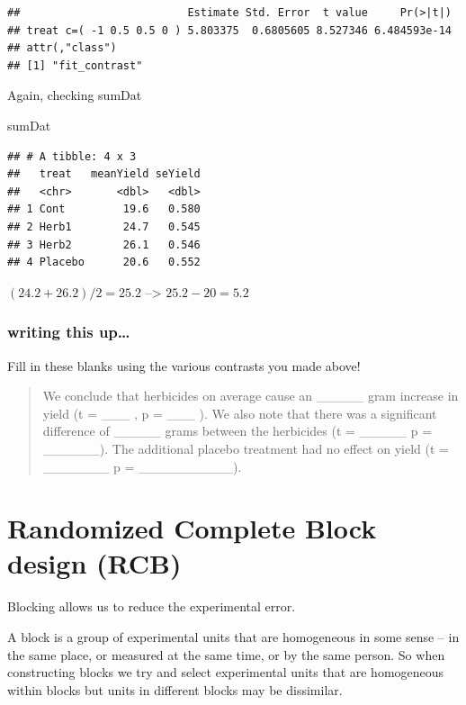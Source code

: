 \documentclass[
]{book}
\newenvironment{Shaded}{\begin{snugshade}}{\end{snugshade}}
\newcommand{\NormalTok}[1]{#1}
\begin{document}
\begin{verbatim}
##                          Estimate Std. Error  t value     Pr(>|t|)
## treat c=( -1 0.5 0.5 0 ) 5.803375  0.6805605 8.527346 6.484593e-14
## attr(,"class")
## [1] "fit_contrast"
\end{verbatim}

Again, checking sumDat

\begin{Shaded}
\begin{Highlighting}[]
\NormalTok{sumDat}
\end{Highlighting}
\end{Shaded}

\begin{verbatim}
## # A tibble: 4 x 3
##   treat   meanYield seYield
##   <chr>       <dbl>   <dbl>
## 1 Cont         19.6   0.580
## 2 Herb1        24.7   0.545
## 3 Herb2        26.1   0.546
## 4 Placebo      20.6   0.552
\end{verbatim}

\((24.2+26.2)/2 = 25.2\) --\textgreater{} \(25.2 - 20 = 5.2\)

\hypertarget{writing-this-up}{%
\subsection{writing this up\ldots{}}\label{writing-this-up}}

Fill in these blanks using the various contrasts you made above!

\begin{quote}
We conclude that herbicides on average cause an \_\_\_\_\_ gram increase in yield (t = \_\_\_ , p = \_\_\_ ). We also note that there was a significant difference of \_\_\_\_\_ grams between the herbicides (t = \_\_\_\_\_ p = \_\_\_\_\_\_). The additional placebo treatment had no effect on yield (t = \_\_\_\_\_\_\_ p = \_\_\_\_\_\_\_\_\_\_).
\end{quote}

\hypertarget{randomized-complete-block-design-rcb}{%
\chapter{Randomized Complete Block design (RCB)}\label{randomized-complete-block-design-rcb}}

Blocking allows us to reduce the experimental error.

A block is a group of experimental units that are homogeneous in some sense -- in the same place, or measured at the same time, or by the same person. So when constructing blocks we try and select experimental units that are homogeneous within blocks but units in different blocks may be dissimilar.
\end{document}
